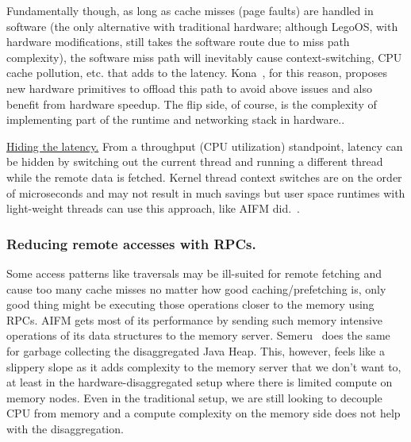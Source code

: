Fundamentally though, as long as cache misses (page faults) are 
handled in software (the only alternative with traditional hardware; 
although LegoOS, with hardware modifications, still takes the
software route due to miss path complexity), the software miss path 
will inevitably cause context-switching, CPU cache pollution,
etc. that adds to the latency. 
Kona~\cite{kona}, for this reason, proposes new hardware 
primitives to offload this path to avoid above issues 
and also benefit from hardware speedup. 
The flip side, of course, is the
complexity of implementing part of the runtime and networking 
stack in hardware.. 

\vspace{5pt}
\noindent \uline{Hiding the latency.}
From a throughput (CPU utilization) standpoint, latency 
can be hidden by switching out the current thread and 
running a different thread while the remote data is fetched.
Kernel thread context switches are on the order of 
microseconds and may not result in much savings 
but user space runtimes with light-weight 
threads can use this approach, like AIFM did.~\cite{aifm}.


\subsubsection{Reducing remote accesses with RPCs.}
Some access patterns like traversals may be ill-suited for remote 
fetching and cause too many cache misses no matter how good 
caching/prefetching is, only good thing might be executing those 
operations closer to the memory using RPCs. 
AIFM gets most of its performance
by sending such memory intensive operations of its data structures to 
the memory server. Semeru~\cite{semeru} does the same for 
garbage collecting the disaggregated Java Heap. This, however,
feels like a slippery slope as it adds complexity to the memory 
server that we don't want to, at least in the hardware-disaggregated 
setup where there is limited compute on memory nodes. 
Even in the traditional setup, we are still looking to decouple 
CPU from memory and a compute complexity on the memory side does 
not help with the disaggregation. 

